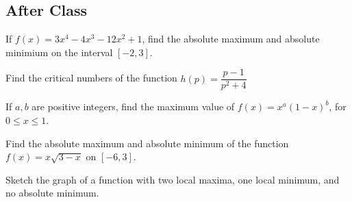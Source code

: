\documentclass[notes]{subfiles}
\begin{document}
	\subsection*{After Class}
		\begin{ex}
			If $f(x) = 3x^4 - 4x^3 - 12x^2 + 1$, find the absolute maximum and absolute minimium on the interval $[-2,3]$.
		\end{ex}
		\begin{ex}
			Find the critical numbers of the function $h(p) =\dfrac{p-1}{p^2+4}$
		\end{ex}
		\begin{ex}
			If $a,b$ are positive integers, find the maximum value of $f(x) = x^a(1-x)^b$, for $0\leq x\leq 1$.
		\end{ex}
			\newpage
					
		\begin{ex}
			Find the absolute maximum and absolute minimum of the function $f(x) = x\sqrt{3-x}$ on $[-6,3]$.
		\end{ex}	
			
		\begin{ex}
			Sketch the graph of a function with two local maxima, one local minimum, and no absolute minimum.
		\end{ex}
	\clearpage
\end{document}
